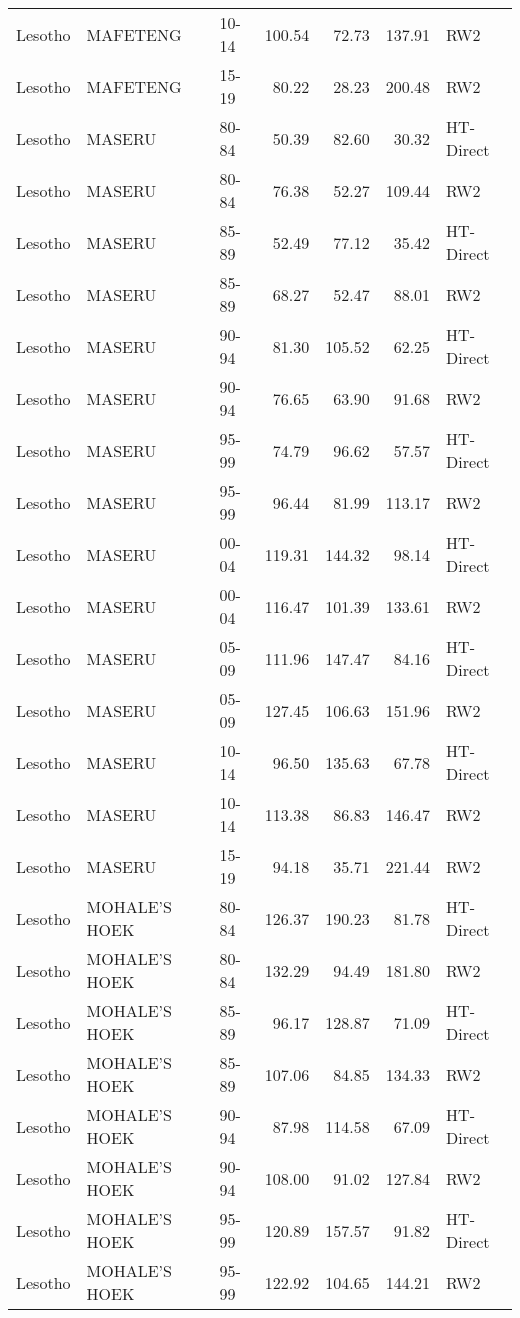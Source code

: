 \begin{longtable}{lllrrrl}
  Lesotho & MAFETENG & 10-14 & 100.54 & 72.73 & 137.91 & RW2 \\ 
  Lesotho & MAFETENG & 15-19 & 80.22 & 28.23 & 200.48 & RW2 \\ 
  Lesotho & MASERU & 80-84 & 50.39 & 82.60 & 30.32 & HT-Direct \\ 
  Lesotho & MASERU & 80-84 & 76.38 & 52.27 & 109.44 & RW2 \\ 
  Lesotho & MASERU & 85-89 & 52.49 & 77.12 & 35.42 & HT-Direct \\ 
  Lesotho & MASERU & 85-89 & 68.27 & 52.47 & 88.01 & RW2 \\ 
  Lesotho & MASERU & 90-94 & 81.30 & 105.52 & 62.25 & HT-Direct \\ 
  Lesotho & MASERU & 90-94 & 76.65 & 63.90 & 91.68 & RW2 \\ 
  Lesotho & MASERU & 95-99 & 74.79 & 96.62 & 57.57 & HT-Direct \\ 
  Lesotho & MASERU & 95-99 & 96.44 & 81.99 & 113.17 & RW2 \\ 
  Lesotho & MASERU & 00-04 & 119.31 & 144.32 & 98.14 & HT-Direct \\ 
  Lesotho & MASERU & 00-04 & 116.47 & 101.39 & 133.61 & RW2 \\ 
  Lesotho & MASERU & 05-09 & 111.96 & 147.47 & 84.16 & HT-Direct \\ 
  Lesotho & MASERU & 05-09 & 127.45 & 106.63 & 151.96 & RW2 \\ 
  Lesotho & MASERU & 10-14 & 96.50 & 135.63 & 67.78 & HT-Direct \\ 
  Lesotho & MASERU & 10-14 & 113.38 & 86.83 & 146.47 & RW2 \\ 
  Lesotho & MASERU & 15-19 & 94.18 & 35.71 & 221.44 & RW2 \\ 
  Lesotho & MOHALE'S HOEK & 80-84 & 126.37 & 190.23 & 81.78 & HT-Direct \\ 
  Lesotho & MOHALE'S HOEK & 80-84 & 132.29 & 94.49 & 181.80 & RW2 \\ 
  Lesotho & MOHALE'S HOEK & 85-89 & 96.17 & 128.87 & 71.09 & HT-Direct \\ 
  Lesotho & MOHALE'S HOEK & 85-89 & 107.06 & 84.85 & 134.33 & RW2 \\ 
  Lesotho & MOHALE'S HOEK & 90-94 & 87.98 & 114.58 & 67.09 & HT-Direct \\ 
  Lesotho & MOHALE'S HOEK & 90-94 & 108.00 & 91.02 & 127.84 & RW2 \\ 
  Lesotho & MOHALE'S HOEK & 95-99 & 120.89 & 157.57 & 91.82 & HT-Direct \\ 
  Lesotho & MOHALE'S HOEK & 95-99 & 122.92 & 104.65 & 144.21 & RW2 \\ 

\end{longtable}
